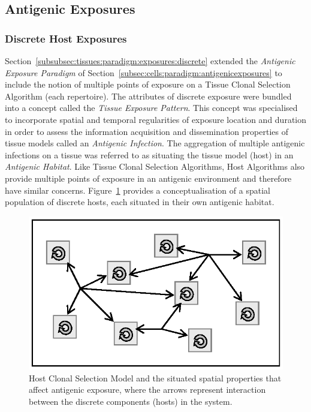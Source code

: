%
%
\subsection{Antigenic Exposures}
\label{sec:hosts:paradigm:exposures}

%
%
\subsubsection{Discrete Host Exposures}
\label{sec:hosts:paradigm:exposures:discrete}
Section~\ref{subsubsec:tissues:paradigm:exposures:discrete} extended the \emph{Antigenic Exposure Paradigm} of Section~\ref{subsec:cells:paradigm:antigenicexposures} to include the notion of multiple points of exposure on a Tissue Clonal Selection Algorithm (each repertoire). The attributes of discrete exposure were bundled into a concept called the \emph{Tissue Exposure Pattern}. This concept was specialised to incorporate spatial and temporal regularities of exposure location and duration in order to assess the information acquisition and dissemination properties of tissue models called an \emph{Antigenic Infection}. The aggregation of multiple antigenic infections on a tissue was referred to as situating the tissue model (host) in an \emph{Antigenic Habitat}. Like Tissue Clonal Selection Algorithms, Host Algorithms also provide multiple points of exposure in an antigenic environment and therefore have similar concerns. Figure~\ref{fig:hosts:paradigm:exposure:spatial} provides a conceptualisation of a spatial population of discrete hosts, each situated in their own antigenic habitat.

\begin{figure}[ht]
	\centering	
	\includegraphics[scale=0.85]{Hosts/hosts-exposure-spatial}
	\caption{Host Clonal Selection Model and the situated spatial properties that affect antigenic exposure, where the arrows represent interaction between the discrete components (hosts) in the system.}
	\label{fig:hosts:paradigm:exposure:spatial}
\end{figure}

